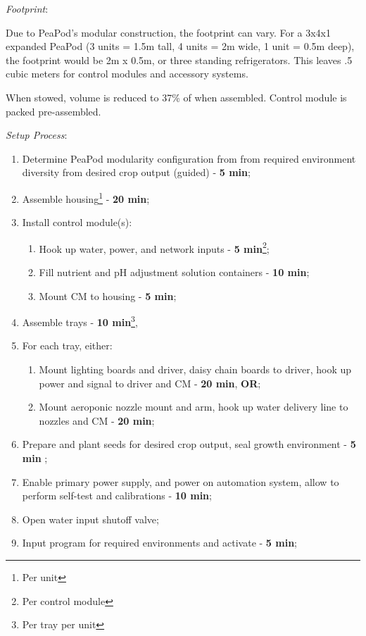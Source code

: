 \documentclass{report}
\begin{document}


\textit{Footprint}:

Due to PeaPod's modular construction, the footprint can vary. For a 3x4x1 expanded PeaPod (3 units = 1.5m tall, 4 units = 2m wide, 1 unit = 0.5m deep), the footprint would be 2m x 0.5m, or three standing refrigerators. This leaves .5 cubic meters for control modules and accessory systems. 

When stowed, volume is reduced to 37\% of when assembled. Control module is packed pre-assembled.

\textit{Setup Process}:

\begin{enumerate}
    \item Determine PeaPod modularity configuration from from required environment diversity from desired crop output (guided) - \textbf{5 min};
    \item Assemble housing\footnote{Per unit} - \textbf{20 min};
    \item Install control module(s):
    \begin{enumerate}
        \item Hook up water, power, and network inputs - \textbf{5 min}\footnote{Per control module};
        \item Fill nutrient and pH adjustment solution containers - \textbf{10 min}\footnotemark[2];
        \item Mount CM to housing - \textbf{5 min}\footnotemark[2];
    \end{enumerate}
    \item Assemble trays - \textbf{10 min}\footnote{Per tray per unit}, 
    \item For each tray, either:
    \begin{enumerate}
        \item Mount lighting boards and driver, daisy chain boards to driver, hook up power and signal to driver and CM - \textbf{20 min}\footnotemark[3], \textbf{OR};
        \item Mount aeroponic nozzle mount and arm, hook up water delivery line to nozzles and CM - \textbf{20 min}\footnotemark[3];
    \end{enumerate}
    \item Prepare and plant seeds for desired crop output, seal growth environment - \textbf{5 min} \footnotemark[1];
    \item Enable primary power supply, and power on automation system, allow to perform self-test and calibrations - \textbf{10 min}\footnotemark[2];
    \item Open water input shutoff valve;
    \item Input program for required environments and activate - \textbf{5 min}\footnotemark[2];
\end{enumerate}
\end{document}
